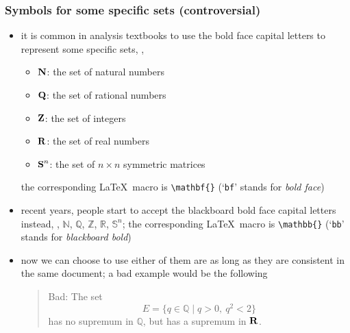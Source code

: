 \documentclass[usepdftitle=false]{beamer}
\begin{document}
\begin{frame}[fragile]
    \frametitle{Symbols for some specific sets (controversial)}

    \begin{itemize}\itemsep=10pt
        \item it is common in analysis textbooks to use the bold face capital letters to represent some specific sets, \eg,
            \begin{itemize}
                \item ${\bf N{}}$: the set of natural numbers
                \item ${\bf Q{}}$: the set of rational numbers
                \item ${\bf Z{}}$: the set of integers
                \item ${\bf R{}}$: the set of real numbers
                \item ${\bf S{}}^n$: the set of $n \times n$ symmetric matrices
            \end{itemize}
            the corresponding \LaTeX\ macro is \verb+\mathbf{}+ (`\texttt{bf}' stands for \emph{bold face})
        \item recent years, people start to accept the blackboard bold face capital letters instead, \eg, $\mathbb{N}$, $\mathbb{Q}$, $\mathbb{Z}$, $\mathbb{R}$, $\mathbb{S}^n$; the corresponding \LaTeX\ macro is \verb+\mathbb{}+ (`\texttt{bb}' stands for \emph{blackboard bold})
        \item now we can choose to use either of them are as long as they are consistent in the same document; a bad example would be the following
            \begin{quote}
                Bad: The set
                \[
                    E = \{q \in \mathbb{Q} \mid q > 0,\ q^2 < 2\}
                \]
                has no supremum in $\mathbb{Q}$, but has a supremum in ${\bf R{}}$.
            \end{quote}
    \end{itemize}

\end{frame}
\end{document}
